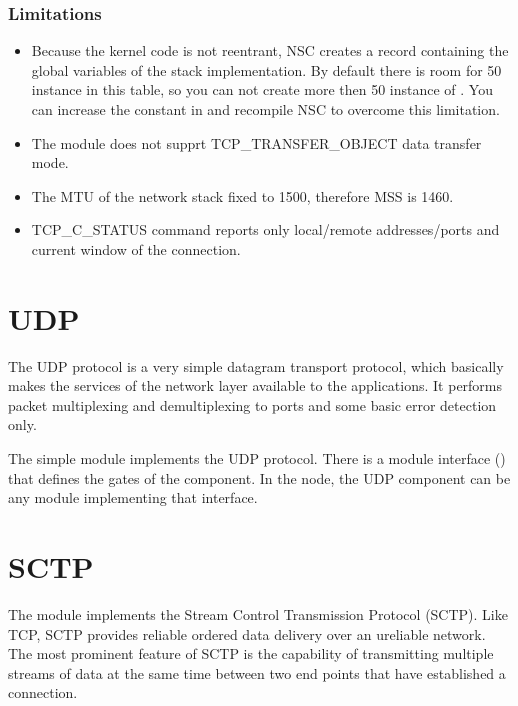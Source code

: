 \subsubsection*{Limitations}

\begin{itemize}
\item Because the kernel code is not reentrant, NSC creates a record containing
the global variables of the stack implementation. By default there is room
for 50 instance in this table, so you can not create more then 50 instance
of . You can increase the  constant
in  and recompile NSC to overcome this limitation.

\item The  module does not supprt TCP\_TRANSFER\_OBJECT
data transfer mode.

\item The MTU of the network stack fixed to 1500, therefore MSS is 1460.

\item TCP\_C\_STATUS command reports only local/remote addresses/ports and
      current window of the connection.

\end{itemize}

\section{UDP}
\label{sec:udp}

The UDP protocol is a very simple datagram transport protocol, which
basically makes the services of the network layer available to the applications.
It performs packet multiplexing and demultiplexing to ports and some basic
error detection only.

The  simple module implements the UDP protocol.
There is a module interface () that defines the gates of the
 component. In the  node, the UDP component
can be any module implementing that interface.


\section{SCTP}
\label{sec:sctp}

The  module implements the Stream Control Transmission Protocol
(SCTP). Like TCP, SCTP provides reliable ordered data delivery over an ureliable
network. The most prominent feature of SCTP is the capability of transmitting
multiple streams of data at the same time between two end points that have
established a connection.

